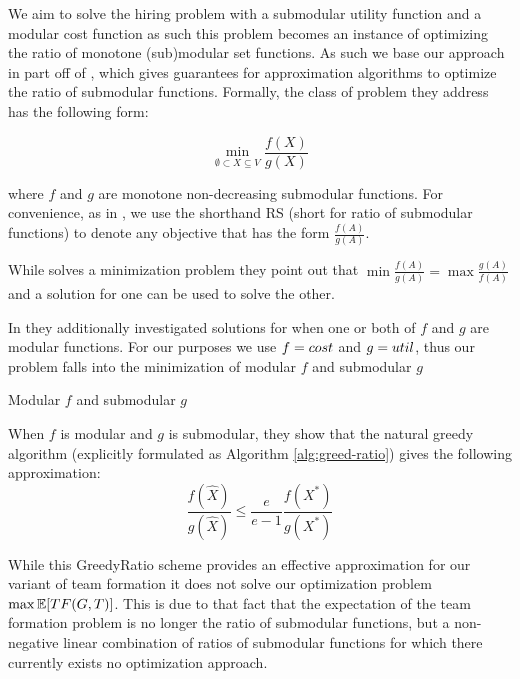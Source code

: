 We aim to solve the hiring problem with a submodular utility function and a modular cost function as such this problem becomes an instance of optimizing the ratio of monotone (sub)modular set functions. As such we base our approach in part off of \cite{bai2016algorithms}, which gives guarantees for approximation algorithms to optimize the ratio of submodular functions.
Formally, the class of problem they address has the following form:

\begin{equation}\label{prob:RS-min}
    \underset{\emptyset \subset X \subseteq V}{\min} \frac{f(X)}{g(X)}
\end{equation}

where $ f $ and $ g $ are monotone non-decreasing submodular functions.
For convenience, as in \cite{bai2016algorithms}, we use the shorthand RS (short for ratio of submodular functions) to denote any objective that has the form $ \frac{f(A)}{g(A)} $.

While \cite{bai2016algorithms} solves a minimization problem they point out that $ \min \frac{f(A)}{g(A)} = \max \frac{g(A)}{f(A)} $ and a solution for one can be used to solve the other. 

In \cite{bai2016algorithms} they additionally investigated solutions for when one or both of $f$ and $g$ are modular functions. For our purposes we use $f=cost$ and $g={util}$, thus our problem falls into the minimization of modular $f$ and submodular $g$ 

\begin{property}
    \label{prop:mod-f-submod-g}
    Modular $ f $ and submodular $ g $
\end{property}

When $ f $ is modular and $ g $ is submodular, they show that the natural greedy algorithm (explicitly formulated as Algorithm \ref{alg:greed-ratio}) gives the following approximation:
\begin{equation}
    \label{eq:greedy-approx}
    \frac{f(\hat{X})}{g(\hat{X})} \leq \frac{e}{e - 1} \frac{f(X^*)}{g(X^*)}
\end{equation}
 



While this GreedyRatio scheme provides an effective approximation for our variant of team formation it does not solve our optimization problem $\max \mathbb{E}[TF(G,T)]$. This is due to that fact that the expectation of the team formation problem is no longer the ratio of submodular functions, but a non-negative linear combination of ratios of submodular functions for which there currently exists no optimization approach. 

